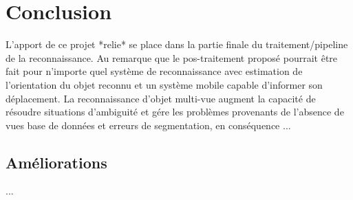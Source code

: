 \chapter{Conclusion}

L'apport de ce projet *relie* se place dans la partie finale du
traitement/pipeline de la reconnaissance. Au remarque que le pos-traitement proposé pourrait être fait pour
n'importe quel système de reconnaissance avec estimation de l'orientation du objet reconnu et un système mobile capable d'informer son déplacement. La reconnaissance d'objet multi-vue augment la capacité de résoudre situations d'ambiguité et gére les problèmes provenants de l'absence de vues base de données et erreurs de segmentation, en conséquence ...

\section{ Améliorations }

...



